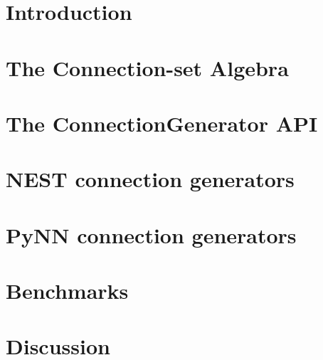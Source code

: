 \documentclass[a4paper]{article}
\begin{document}
\section{Introduction}






\section{The Connection-set Algebra}




\section{The ConnectionGenerator API}



\section{NEST connection generators}


\section{PyNN connection generators}


\section{Benchmarks}


\section{Discussion}
\end{document}
